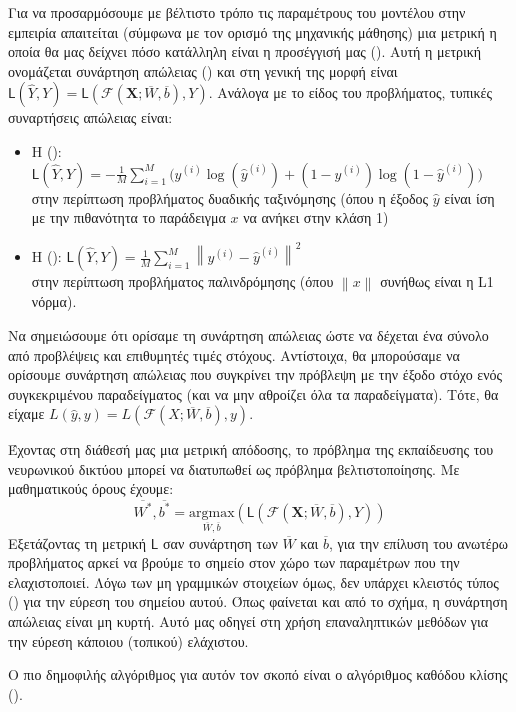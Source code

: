 Για να προσαρμόσουμε με βέλτιστο τρόπο τις παραμέτρους του μοντέλου στην εμπειρία απαιτείται (σύμφωνα με τον ορισμό της μηχανικής μάθησης) μια μετρική η οποία θα μας δείχνει πόσο κατάλληλη είναι η προσέγγισή μας (). Αυτή η μετρική ονομάζεται συνάρτηση απώλειας () και στη γενική της μορφή είναι \( \mathsf{L}(\hat{Y},Y) = \mathsf{L}(\mathcal{F}(\boldsymbol{X};\overline{W},\overline{b}),Y)\). Ανάλογα με το είδος του προβλήματος, τυπικές συναρτήσεις απώλειας είναι:
\begin{itemize}
  \item H (): $\mathsf{L}(\hat{Y},Y) = -\frac{1}{M}\sum_{i = 1}^{M} \big(y^{(i)}\log(\hat{y}^{(i)}) + (1 - y^{(i)})\log(1 - \hat{y}^{(i)})\big)$ \\στην περίπτωση προβλήματος δυαδικής ταξινόμησης (όπου η έξοδος $\hat{y}$ είναι ίση με την πιθανότητα το παράδειγμα $x$ να ανήκει στην κλάση 1)
  \item Η (): $\mathsf{L}(\hat{Y},Y) = \frac{1}{M}\sum_{i = 1}^{M}{\left\lVert y^{(i)} - \hat{y}^{(i)}\right\rVert}^2 $\\ στην περίπτωση προβλήματος παλινδρόμησης (όπου $\left\lVert x \right\rVert$ συνήθως είναι η L1 νόρμα).
\end{itemize}
Να σημειώσουμε ότι ορίσαμε τη συνάρτηση απώλειας ώστε να δέχεται ένα σύνολο από προβλέψεις και επιθυμητές τιμές στόχους. Αντίστοιχα, θα μπορούσαμε να ορίσουμε συνάρτηση απώλειας που συγκρίνει την πρόβλεψη με την έξοδο στόχο ενός συγκεκριμένου παραδείγματος (και να μην αθροίζει όλα τα παραδείγματα). Τότε, θα είχαμε \( L(\hat{y},y) = L(\mathcal{F}(X;\overline{W},\overline{b}),y)\). \par

Έχοντας στη διάθεσή μας μια μετρική απόδοσης, το πρόβλημα της εκπαίδευσης του νευρωνικού δικτύου μπορεί να διατυπωθεί ως πρόβλημα βελτιστοποίησης. Με μαθηματικούς όρους έχουμε:
\begin{equation}
  \overline{W^*},\overline{b^*} = \underset{\overline{W},\overline{b}}{\mathrm{argmax}}(\mathsf{L}(\mathcal{F}(\boldsymbol{X};\overline{W},\overline{b}),Y))
\end{equation}
Εξετάζοντας τη μετρική $\mathsf{L}$ σαν συνάρτηση των $\overline{W}$ και $\overline{b}$, για την επίλυση του ανωτέρω προβλήματος αρκεί να βρούμε το σημείο στον χώρο των παραμέτρων που την ελαχιστοποιεί. Λόγω των μη γραμμικών στοιχείων όμως, δεν υπάρχει κλειστός τύπος () για την εύρεση του σημείου αυτού. Όπως φαίνεται και από το σχήμα, η συνάρτηση απώλειας είναι μη κυρτή. Αυτό μας οδηγεί στη χρήση επαναληπτικών μεθόδων για την εύρεση κάποιου (τοπικού) ελάχιστου. \par
Ο πιο δημοφιλής αλγόριθμος για αυτόν τον σκοπό είναι ο αλγόριθμος καθόδου κλίσης ().
